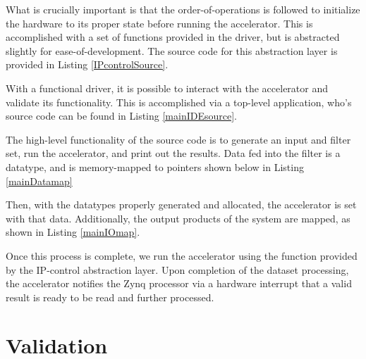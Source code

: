 \documentclass[11pt]{report}
\begin{document}
What is crucially important is that the order-of-operations is followed to initialize the hardware to its proper state before running the accelerator. This is accomplished with a set of functions provided in the driver, but is abstracted slightly for ease-of-development. The source code for this abstraction layer is provided in Listing \ref{IPcontrolSource}.

With a functional driver, it is possible to interact with the accelerator and validate its functionality. This is accomplished via a top-level application, who's source code can be found in Listing \ref{mainIDEsource}.

The high-level functionality of the source code is to generate an input and filter set, run the accelerator, and print out the results. Data fed into the filter is a  datatype, and is memory-mapped to pointers shown below in Listing \ref{mainDatamap}

	   \begin{singlespace}
            
        \end{singlespace} 
        
Then, with the datatypes properly generated and allocated, the accelerator is set with that data. Additionally, the output products of the system are mapped, as shown in Listing \ref{mainIOmap}.

	   \begin{singlespace}
            
        \end{singlespace} 
        
Once this process is complete, we run the accelerator using the  function provided by the IP-control abstraction layer. Upon completion of the dataset processing, the accelerator notifies the Zynq processor via a hardware interrupt that a valid result is ready to be read and further processed.
        
 
\section{Validation}
       
\end{document}
